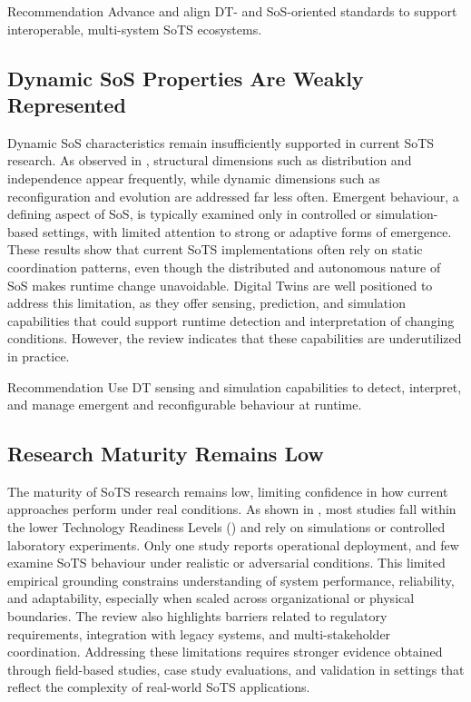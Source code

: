\begin{extrarecoframe}{Recommendation}
Advance and align DT- and SoS-oriented standards to support interoperable, multi-system SoTS ecosystems.
\end{extrarecoframe}


\subsection*{Dynamic SoS Properties Are Weakly Represented}

Dynamic SoS characteristics remain insufficiently supported in current SoTS research. As observed in , structural dimensions such as distribution and independence appear frequently, while dynamic dimensions such as reconfiguration and evolution are addressed far less often. Emergent behaviour, a defining aspect of SoS, is typically examined only in controlled or simulation-based settings, with limited attention to strong or adaptive forms of emergence. These results show that current SoTS implementations often rely on static coordination patterns, even though the distributed and autonomous nature of SoS makes runtime change unavoidable. Digital Twins are well positioned to address this limitation, as they offer sensing, prediction, and simulation capabilities that could support runtime detection and interpretation of changing conditions. However, the review indicates that these capabilities are underutilized in practice.

\begin{extrarecoframe}{Recommendation}
Use DT sensing and simulation capabilities to detect, interpret, and manage emergent and reconfigurable behaviour at runtime.
\end{extrarecoframe}


\subsection*{Research Maturity Remains Low}

The maturity of SoTS research remains low, limiting confidence in how current approaches perform under real conditions. As shown in , most studies fall within the lower Technology Readiness Levels () and rely on simulations or controlled laboratory experiments. Only one study reports operational deployment, and few examine SoTS behaviour under realistic or adversarial conditions. This limited empirical grounding constrains understanding of system performance, reliability, and adaptability, especially when scaled across organizational or physical boundaries. The review also highlights barriers related to regulatory requirements, integration with legacy systems, and multi-stakeholder coordination. Addressing these limitations requires stronger evidence obtained through field-based studies, case study evaluations, and validation in settings that reflect the complexity of real-world SoTS applications.

